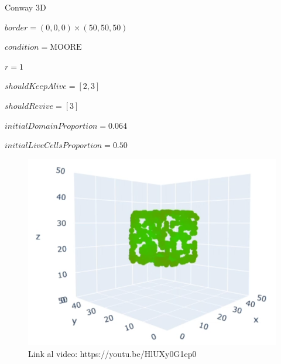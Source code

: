 \begin{frame}{Conway 3D}
    \begin{multicols}{2}
        {
            $border = (0, 0, 0) \times (50, 50, 50)$

            $condition = \text{MOORE}$

            $r = 1$

            $shouldKeepAlive = [2, 3]$

            $shouldRevive = [3]$

            $initialDomainProportion = 0.064$

            $initialLiveCellsProportion = 0.50$
        }

        {\begin{figure}[H]
             \centering
             \includegraphics[width=1\linewidth]{pic/conway3d/thumbnail_i50}
             \captionsetup{labelformat=empty}
             \caption{Link al video: https://youtu.be/HlUXy0G1ep0}
             \label{fig:conway3D:thumbnail}
        \end{figure}}
    \end{multicols}
\end{frame}



